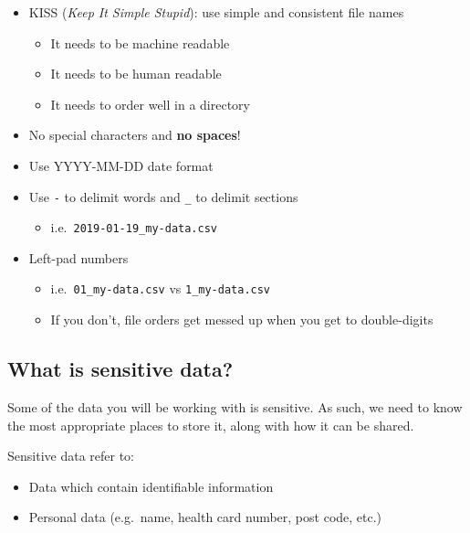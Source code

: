 \documentclass[]{book}
\providecommand{\tightlist}{%
  \setlength{\itemsep}{0pt}\setlength{\parskip}{0pt}}
\begin{document}
\begin{itemize}
\tightlist
\item
  KISS (\emph{Keep It Simple Stupid}): use simple and consistent file names

  \begin{itemize}
  \tightlist
  \item
    It needs to be machine readable
  \item
    It needs to be human readable
  \item
    It needs to order well in a directory
  \end{itemize}
\item
  No special characters and \textbf{no spaces}!
\item
  Use YYYY-MM-DD date format
\item
  Use \texttt{-} to delimit words and \texttt{\_} to delimit sections

  \begin{itemize}
  \tightlist
  \item
    i.e.~\texttt{2019-01-19\_my-data.csv}
  \end{itemize}
\item
  Left-pad numbers

  \begin{itemize}
  \tightlist
  \item
    i.e.~\texttt{01\_my-data.csv} vs \texttt{1\_my-data.csv}
  \item
    If you don't, file orders get messed up when you get to double-digits
  \end{itemize}
\end{itemize}

\hypertarget{what-is-sensitive-data}{%
\subsection{What is sensitive data?}\label{what-is-sensitive-data}}

Some of the data you will be working with is sensitive. As such, we need to know the most appropriate places to store it, along with how it can be shared.

Sensitive data refer to:

\begin{itemize}
\tightlist
\item
  Data which contain identifiable information
\item
  Personal data (e.g.~name, health card number, post code, etc.)
\end{itemize}
\end{document}
